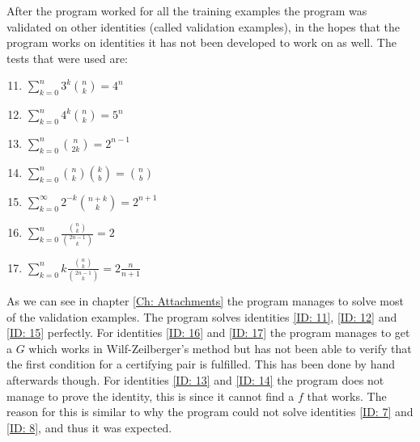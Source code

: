 After the program worked for all the training examples the program was validated on other identities (called validation examples), in the hopes that the program works on identities it has not been developed to work on as well. The tests that were used are:
\begin{enumerate}
  \setcounter{enumi}{10}
  \item $\sum_{k=0}^n 3^k\binom{n}{k} = 4^n$ \label{ID: 11}
  \item $\sum_{k=0}^n 4^k\binom{n}{k} = 5^n$ \label{ID: 12}
  \item $\sum_{k=0}^n \binom{n}{2k} = 2^{n-1}$ \label{ID: 13}
  \item $\sum_{k=0}^n \binom{n}{k}\binom{k}{b} = \binom{n}{b}$ \label{ID: 14}
  \item $\sum_{k=0}^\infty 2^{-k}\binom{n+k}{k} = 2^{n+1}$ \label{ID: 15}
  \item $\sum_{k=0}^n \frac{\binom{n}{k}}{\binom{2n-1}{k}} = 2$ \label{ID: 16}
  \item $\sum_{k=0}^n k\frac{\binom{n}{k}}{\binom{2n-1}{k}} = 2\frac{n}{n+1}$ \label{ID: 17}
\end{enumerate}
As we can see in chapter \ref{Ch: Attachments} the program manages to solve most of the validation examples. The program solves identities \ref{ID: 11}, \ref{ID: 12} and \ref{ID: 15} perfectly. For identities \ref{ID: 16} and \ref{ID: 17} the program manages to get a $G$ which works in Wilf-Zeilberger's method but has not been able to verify that the first condition for a certifying pair is fulfilled. This has been done by hand afterwards though. For identities \ref{ID: 13} and \ref{ID: 14} the program does not manage to prove the identity, this is since it cannot find a $f$ that works. The reason for this is similar to why the program could not solve identities \ref{ID: 7} and \ref{ID: 8}, and thus it was expected.
